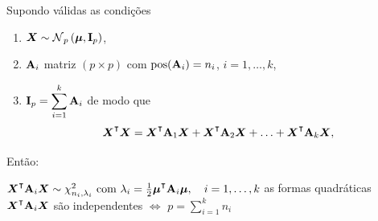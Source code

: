 \begin{corollary}
	Supondo válidas as condições
	\begin{enumerate}
		\item $\v{X}\sim\normdist[p]{\v{\mu},\m{I}_p}$,
		\item $\mathbf{A}_i$ matriz $(p\times p)$ com $\operatorname{pos}(\mathbf{A}_i) = n_i$, $i=1,\ldots,k$,
		\item $\mathbf{I}_p = \displaystyle\sum_{i=1}^k \mathbf{A}_i$ de modo que
		\begin{equation}
			\v{X}\T\v{X} = \v{X}\T\m{A}_1\v{X} + \v{X}\T\m{A}_2\v{X} + \ldots + \v{X}\T\m{A}_k\v{X},
		\end{equation}
	\end{enumerate}
	Então:
	\begin{outline}[enumerate]
		\1 \( \v{X}\T\m{A}_i\v{X} \sim \chidist{n_i,\lambda_i} \text{ com } \lambda_i = \frac{1}{2}\v{\mu}\T\m{A}_i\v{\mu}, \quad i=1,\ldots,k \)
		\1 as formas quadráticas $\v{X}\T\m{A}_i\v{X}$ são independentes $\iff$ $p = \displaystyle\sum_{i=1}^k n_i$
	\end{outline}
\end{corollary}
